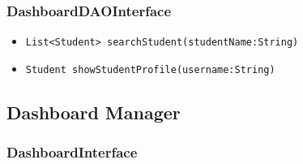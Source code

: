 \subsubsection{DashboardDAOInterface}
\begin{itemize}
    \item \texttt{List<Student> searchStudent(studentName:String)}
    \item \texttt{Student showStudentProfile(username:String)}
\end{itemize}

\subsection{Dashboard Manager}
\subsubsection{DashboardInterface}

